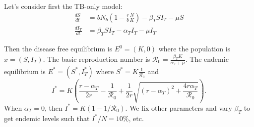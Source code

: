 \documentclass[letterpaper,12pt]{article}
\begin{document}








Let's consider first the TB-only model:
\begin{align}
\frac{dS}{dt}&=b N_b\left(1-\frac{r}{b}\frac{N}{K}\right) -\beta_T S I_T - \mu S\\
\frac{dI_T}{dt}&=\beta_T S I_T - \alpha_T I_T - \mu I_T
\end{align}

Then the disease free equilibrium is $E^0=(K,0)$ where the population is $x=(S,I_T)$. The basic reproduction number is $\mathcal{R}_0=\frac{\beta_T K}{\alpha_T + \mu}$. The endemic equilibrium is $E^*=(S^*,I_T^*)$ where $S^*=K\frac{1}{\mathcal{R}_0}$ and 
\begin{equation*}
I^*=K\left( \frac{r-\alpha_T}{2r}-\frac{1}{\mathcal{R}_0} + \frac{1}{2r}\sqrt{(r-\alpha_T)^2 + \frac{4r\alpha_T}{\mathcal{R}_0}}\right).
\end{equation*}
When $\alpha_T=0$, then $I^*=K(1-1/\mathcal{R}_0)$. We fix other parameters and vary $\beta_T$ to get endemic levels such that $I^*/N=10\%$, etc.
\pagebreak
\end{document}
